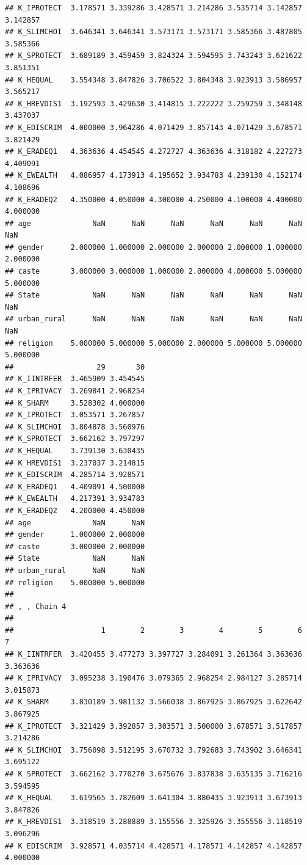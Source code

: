 \documentclass[
]{article}
\begin{document}
\begin{verbatim}
## K_IPROTECT  3.178571 3.339286 3.428571 3.214286 3.535714 3.142857 3.142857
## K_SLIMCHOI  3.646341 3.646341 3.573171 3.573171 3.585366 3.487805 3.585366
## K_SPROTECT  3.689189 3.459459 3.824324 3.594595 3.743243 3.621622 3.851351
## K_HEQUAL    3.554348 3.847826 3.706522 3.804348 3.923913 3.586957 3.565217
## K_HREVDIS1  3.192593 3.429630 3.414815 3.222222 3.259259 3.348148 3.437037
## K_EDISCRIM  4.000000 3.964286 4.071429 3.857143 4.071429 3.678571 3.821429
## K_ERADEQ1   4.363636 4.454545 4.272727 4.363636 4.318182 4.227273 4.409091
## K_EWEALTH   4.086957 4.173913 4.195652 3.934783 4.239130 4.152174 4.108696
## K_ERADEQ2   4.350000 4.050000 4.300000 4.250000 4.100000 4.400000 4.000000
## age              NaN      NaN      NaN      NaN      NaN      NaN      NaN
## gender      2.000000 1.000000 2.000000 2.000000 2.000000 1.000000 2.000000
## caste       3.000000 3.000000 1.000000 2.000000 4.000000 5.000000 5.000000
## State            NaN      NaN      NaN      NaN      NaN      NaN      NaN
## urban_rural      NaN      NaN      NaN      NaN      NaN      NaN      NaN
## religion    5.000000 5.000000 5.000000 2.000000 5.000000 5.000000 5.000000
##                   29       30
## K_IINTRFER  3.465909 3.454545
## K_IPRIVACY  3.269841 2.968254
## K_SHARM     3.528302 4.000000
## K_IPROTECT  3.053571 3.267857
## K_SLIMCHOI  3.804878 3.560976
## K_SPROTECT  3.662162 3.797297
## K_HEQUAL    3.739130 3.630435
## K_HREVDIS1  3.237037 3.214815
## K_EDISCRIM  4.285714 3.928571
## K_ERADEQ1   4.409091 4.500000
## K_EWEALTH   4.217391 3.934783
## K_ERADEQ2   4.200000 4.450000
## age              NaN      NaN
## gender      1.000000 2.000000
## caste       3.000000 2.000000
## State            NaN      NaN
## urban_rural      NaN      NaN
## religion    5.000000 5.000000
## 
## , , Chain 4
## 
##                    1        2        3        4        5        6        7
## K_IINTRFER  3.420455 3.477273 3.397727 3.284091 3.261364 3.363636 3.363636
## K_IPRIVACY  3.095238 3.190476 3.079365 2.968254 2.984127 3.285714 3.015873
## K_SHARM     3.830189 3.981132 3.566038 3.867925 3.867925 3.622642 3.867925
## K_IPROTECT  3.321429 3.392857 3.303571 3.500000 3.678571 3.517857 3.214286
## K_SLIMCHOI  3.756098 3.512195 3.670732 3.792683 3.743902 3.646341 3.695122
## K_SPROTECT  3.662162 3.770270 3.675676 3.837838 3.635135 3.716216 3.594595
## K_HEQUAL    3.619565 3.782609 3.641304 3.880435 3.923913 3.673913 3.847826
## K_HREVDIS1  3.318519 3.288889 3.155556 3.325926 3.355556 3.118519 3.096296
## K_EDISCRIM  3.928571 4.035714 4.428571 4.178571 4.142857 4.142857 4.000000

\end{verbatim}
\end{document}
